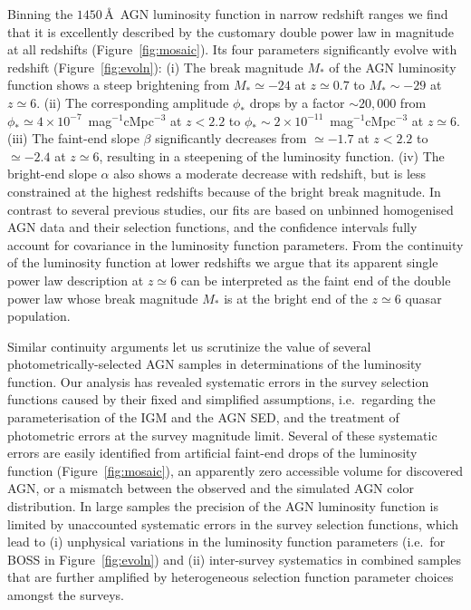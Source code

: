 \documentclass[fleqn,usenatbib]{mnras}
\begin{document}
Binning the $1450$\,\AA\ AGN luminosity function in narrow redshift
ranges we find that it is excellently described by the customary
double power law in magnitude at all redshifts
(Figure~\ref{fig:mosaic}).  Its four parameters significantly evolve
with redshift (Figure~\ref{fig:evoln}): (i) The break magnitude $M_*$
of the AGN luminosity function shows a steep brightening from
$M_*\simeq -24$ at $z\simeq 0.7$ to $M_*\sim -29$ at $z\simeq 6$.
(ii) The corresponding amplitude $\phi_*$ drops by a factor $\sim
20,000$ from $\phi_*\simeq 4\times 10^{-7}$~mag$^{-1}$cMpc$^{-3}$ at
$z<2.2$ to $\phi_*\sim 2\times 10^{-11}$~mag$^{-1}$cMpc$^{-3}$ at
$z\simeq 6$.  (iii) The faint-end slope $\beta$ significantly
decreases from $\simeq -1.7$ at $z<2.2$ to $\simeq -2.4$ at $z\simeq
6$, resulting in a steepening of the luminosity function.  (iv) The
bright-end slope $\alpha$ also shows a moderate decrease with
redshift, but is less constrained at the highest redshifts because of
the bright break magnitude.  In contrast to several previous studies,
our fits are based on unbinned homogenised AGN data and their
selection functions, and the confidence intervals fully account for
covariance in the luminosity function parameters.  From the continuity
of the luminosity function at lower redshifts we argue that its
apparent single power law description at $z\simeq 6$ can be
interpreted as the faint end of the double power law whose break
magnitude $M_*$ is at the bright end of the $z\simeq 6$ quasar
population.

Similar continuity arguments let us scrutinize the value of several
photometrically-selected AGN samples in determinations of the
luminosity function.  Our analysis has revealed systematic errors in
the survey selection functions caused by their fixed and simplified
assumptions, i.e.\ regarding the parameterisation of the IGM and the
AGN SED, and the treatment of photometric errors at the survey
magnitude limit.  Several of these systematic errors are easily
identified from artificial faint-end drops of the luminosity function
(Figure~\ref{fig:mosaic}), an apparently zero accessible volume for
discovered AGN, or a mismatch between the observed and the simulated
AGN color distribution.  In large samples the precision of the AGN
luminosity function is limited by unaccounted systematic errors in the
survey selection functions, which lead to (i) unphysical variations in
the luminosity function parameters (i.e.\ for BOSS in
Figure~\ref{fig:evoln}) and (ii) inter-survey systematics in combined
samples that are further amplified by heterogeneous selection function
parameter choices amongst the surveys.
\end{document}
